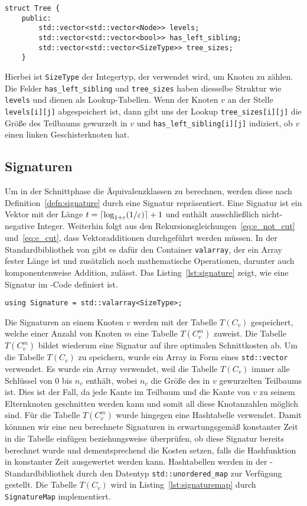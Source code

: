 \begin{lstlisting}[caption={Definition von \texttt{struct Tree}}, label={lst:structtree}]
struct Tree {
    public:
        std::vector<std::vector<Node>> levels;
        std::vector<std::vector<bool>> has_left_sibling;
        std::vector<std::vector<SizeType>> tree_sizes;
    }
\end{lstlisting}
Hierbei ist \texttt{SizeType} der Integertyp, der verwendet wird, um Knoten zu zählen.
Die Felder \texttt{has\_left\_sibling} und \texttt{tree\_sizes} haben diesselbe Struktur wie \texttt{levels} und dienen als Lookup-Tabellen.
Wenn der Knoten $v$ an der Stelle \texttt{levels[i][j]} abgespeichert ist, dann gibt uns der Lookup \texttt{tree\_sizes[i][j]} die Größe des Teilbaums gewurzelt in $v$ und \texttt{has\_left\_sibling[i][j]} indiziert, ob $v$ einen linken Geschisterknoten hat.

\subsection{Signaturen}
Um in der Schnittphase die Äquivalenzklassen zu berechnen, werden diese nach Definition~\ref{defn:signature} durch eine Signatur repräsentiert.
Eine Signatur ist ein Vektor mit der Länge $t = \lceil\log_{1+\varepsilon}(1/\varepsilon)\rceil + 1$ und enthält ausschließlich nicht-negative Integer.
Weiterhin folgt aus den Rekursionsgleichungen~\eqref{eq:e_not_cut} und~\eqref{eq:e_cut}, dass Vektoradditionen durchgeführt werden müssen.
In der Standardbibliothek von \Cpp{} gibt es dafür den Container \texttt{valarray}, der ein Array fester Länge ist und zusätzlich noch mathematische Operationen, darunter auch komponentenweise Addition, zulässt. 
Das Listing~\ref{lst:signature} zeigt, wie eine Signatur im \Cpp\hyp Code definiert ist.
\begin{lstlisting}[caption={Definition von \texttt{Signature}}, label={lst:signature}]
using Signature = std::valarray<SizeType>;
\end{lstlisting}

Die Signaturen an einem Knoten $v$ werden mit der Tabelle $T(C_v)$ gespeichert, welche einer Anzahl von Knoten $m$ eine Tabelle $T(C_v^m)$ zuweist.
Die Tabelle $T(C_v^m)$ bildet wiederum eine Signatur auf ihre optimalen Schnittkosten ab.
Um die Tabelle $T(C_v)$ zu speichern, wurde ein Array in Form eines \texttt{std::vector} verwendet.
Es wurde ein Array verwendet, weil die Tabelle $T(C_v)$ immer alle Schlüssel von $0$ bis $n_v$ enthält, wobei $n_v$ die Größe des in $v$ gewurzelten Teilbaums ist.
Dies ist der Fall, da jede Kante im Teilbaum und die Kante von $v$ zu seinem Elternknoten geschnitten werden kann und somit all diese Knotanzahlen möglich sind.
Für die Tabelle $T(C_v^m)$ wurde hingegen eine Hashtabelle verwendet.
 Damit könnnen wir eine neu berechnete Signaturen in erwartungsgemäß konstanter Zeit in die Tabelle einfügen beziehungsweise überprüfen, ob diese Signatur bereits berechnet wurde und dementsprechend die Kosten setzen, falls die Hashfunktion in konstanter Zeit ausgewertet werden kann.
Hashtabellen werden in der \Cpp\hyp Standardbibliothek durch den Datentyp \texttt{std::unordered\_map} zur Verfügung gestellt.
Die Tabelle $T(C_v)$ wird in Listing~\ref{lst:signaturemap} durch \texttt{SignatureMap} implementiert.

